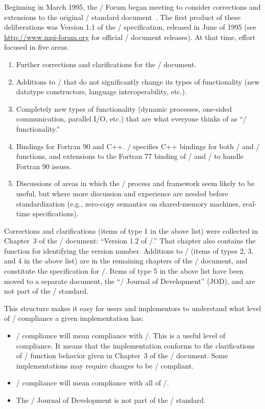 Beginning in March 1995, the \MPI/ Forum began meeting to
consider corrections and extensions to the original \MPI/ standard
document~\cite{MPISTDORG}.  The first product of these deliberations was
Version 1.1 of the \MPI/ specification, released in June of 1995
\cite{MPISTD}
(see \\
\url{http://www.mpi-forum.org} for official \MPI/ document releases).
At that time, effort focused
in
five areas.
\begin{enumerate}
\item Further corrections and clarifications for the \mpiidoti/ document.
\item Additions to \mpiidoti/ that do not significantly change its types of
  functionality (new datatype constructors, language interoperability, etc.).
\item Completely new types of functionality (dynamic processes, one-sided
  communication, parallel I/O, etc.) that are what everyone thinks of as
  ``\MPIII/ functionality.''
\item Bindings for Fortran 90 and C++.
\MPIII/ specifies
  C++ bindings
  for both \mpii/ and \mpiii/ functions, and extensions to the Fortran 77
  binding of \mpii/ and \mpiii/ to handle Fortran 90 issues.
\item Discussions of areas in which the \MPI/ process and framework seem likely
  to be useful, but where more discussion and experience are needed before
  standardization (e.g.,
  zero-copy
  semantics on shared-memory machines, real-time
  specifications).
\end{enumerate}

Corrections and clarifications (items of type 1 in the above list)
were
collected in Chapter~3 of the \MPIII/ document:
``Version 1.2 of \MPI/.''
That
chapter also contains the function for
identifying the version number.  Additions to \mpiidoti/ (items of
types 2, 3, and 4 in the above list) are in the
remaining chapters of the \MPIII/ document,
and constitute the specification for
\mpiii/.
Items of type 5 in the
above list have been moved to a separate document, the ``\MPI/ Journal
of Development'' (JOD), and are not part of the \mpiii/ standard.

This structure makes it easy for users and implementors to understand
what level of \MPI/ compliance a given implementation has:
\begin{itemize}
\item \mpii/ compliance will mean compliance with \mpiidotiii/.
  This is a useful level of compliance.  It means that the
  implementation conforms to the clarifications of \mpiidoti/ function
  behavior given in Chapter~3 of the \MPIII/ document.  Some
  implementations may require changes to be \mpii/ compliant.
\item \mpiii/ compliance will mean compliance with all of
  \mpiiidoti/.
\item The \MPI/ Journal of Development is not part of the \MPI/ standard.
\end{itemize}


